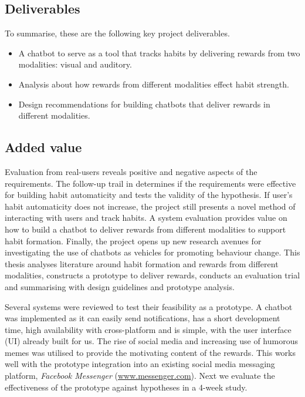\subsection*{Deliverables}
To summarise, these are the following key project deliverables.

\begin{itemize}
  \item A chatbot to serve as a tool that tracks habits by delivering rewards from two modalities: visual and auditory.
  \item Analysis about how rewards from different modalities effect habit strength.
  \item Design recommendations for building chatbots that deliver rewards in different modalities.
\end{itemize}

\subsection*{Added value}
Evaluation from real-users reveals positive and negative aspects of the requirements. The follow-up trail in determines if the requirements were effective for building habit automaticity and tests the validity of the hypothesis. If user's habit automaticity does not increase, the project still presents a novel method of interacting with users and track habits. A system evaluation provides value on how to build a chatbot to deliver rewards from different modalities to support habit formation. Finally, the project opens up new research avenues for investigating the use of chatbots as vehicles for promoting behaviour change.\newline
\newline
This thesis analyses literature around habit formation and rewards from different modalities, constructs a prototype to deliver rewards, conducts an evaluation trial and summarising with design guidelines and prototype analysis.




Several systems were reviewed to test their feasibility as a prototype. A chatbot was implemented as it can easily send notifications, has a short development time, high availability with cross-platform and is simple, with the user interface (UI) already built for us. The rise of social media and increasing use of humorous memes was utilised to provide the motivating content of the rewards. This works well with the prototype integration into an existing social media messaging platform, \textit{Facebook Messenger} (\url{www.messenger.com}). Next we evaluate the effectiveness of the prototype against hypotheses in a 4-week study.

\newpage
